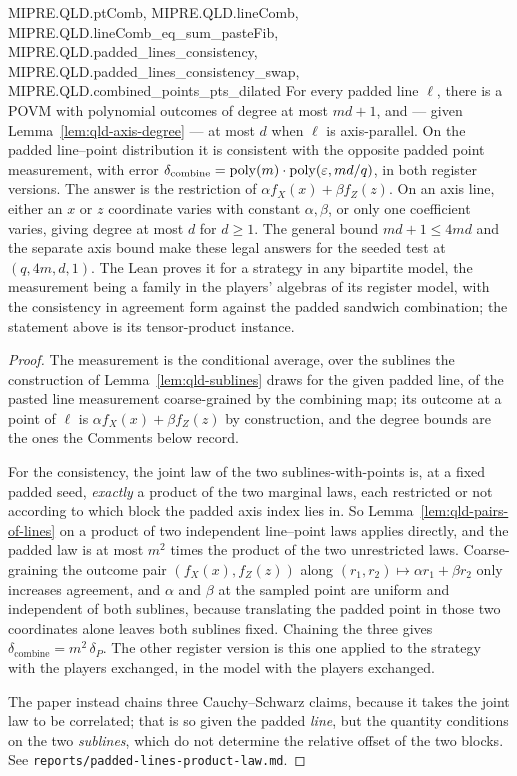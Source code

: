 \begin{lemma}
{  MIPRE.QLD.ptComb, MIPRE.QLD.lineComb, MIPRE.QLD.lineComb_eq_sum_pasteFib,
  MIPRE.QLD.padded_lines_consistency, MIPRE.QLD.padded_lines_consistency_swap,
  MIPRE.QLD.combined_points_pts_dilated}
\leanok
For every padded line $\ell$, there is a POVM with polynomial outcomes of
degree at most $md+1$, and --- given Lemma~\ref{lem:qld-axis-degree} --- at
most $d$ when $\ell$ is axis-parallel.
On the padded line--point distribution it is consistent with the opposite
padded point measurement, with error
$\delta_{\mathrm{combine}}=\mathrm{poly}(m)\cdot\mathrm{poly}(\varepsilon,md/q)$, in both register
versions.
The answer is the restriction of $\alpha f_X(x)+\beta f_Z(z)$.
On an axis line, either an $x$ or $z$ coordinate varies with constant
$\alpha,\beta$, or only one coefficient varies, giving degree at most $d$
for $d\geq1$. The general bound $md+1\leq4md$ and the separate axis bound
make these legal answers for the seeded test at $(q,4m,d,1)$.
The Lean proves it for a strategy in any bipartite model, the measurement being a family in the
players' algebras of its register model, with the consistency in agreement form against the padded
sandwich combination; the statement above is its tensor-product instance.
\end{lemma}

\begin{proof}
\leanok
The measurement is the conditional average, over the sublines the construction of
Lemma~\ref{lem:qld-sublines} draws for the given padded line, of the pasted line measurement
coarse-grained by the combining map; its outcome at a point of $\ell$ is
$\alpha f_X(x) + \beta f_Z(z)$ by construction, and the degree bounds are the ones the Comments
below record.

For the consistency, the joint law of the two sublines-with-points is, at a fixed padded seed,
\emph{exactly} a product of the two marginal laws, each restricted or not according to which block
the padded axis index lies in. So Lemma~\ref{lem:qld-pairs-of-lines} on a product of two independent
line--point laws applies directly, and the padded law is at most $m^2$ times the product of the two
unrestricted laws. Coarse-graining the outcome pair $(f_X(x),f_Z(z))$ along
$(r_1,r_2)\mapsto \alpha r_1 + \beta r_2$ only increases agreement, and $\alpha$ and $\beta$ at the
sampled point are uniform and independent of both sublines, because translating the padded point in
those two coordinates alone leaves both sublines fixed. Chaining the three gives
$\delta_{\mathrm{combine}} = m^2\,\delta_P$. The other register version is this one applied to the
strategy with the players exchanged, in the model with the players exchanged.

The paper instead chains three Cauchy--Schwarz claims, because it takes the joint law to be
correlated; that is so given the padded \emph{line}, but the quantity conditions on the two
\emph{sublines}, which do not determine the relative offset of the two blocks. See
\texttt{reports/padded-lines-product-law.md}.
\end{proof}

